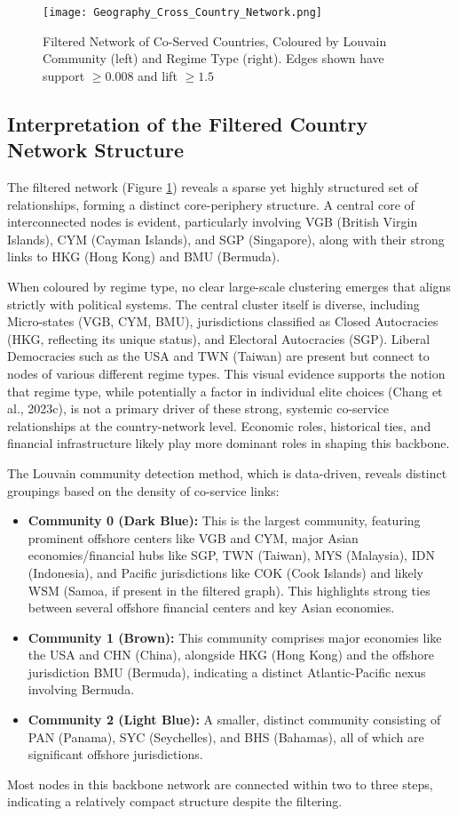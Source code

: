 \begin{figure}[htbp]
    \centering
    \texttt{[image: Geography\_Cross\_Country\_Network.png]}
    \caption{Filtered Network of Co-Served Countries, Coloured by Louvain Community (left) and Regime Type (right). Edges shown have support $\ge 0.008$ and lift $\ge 1.5$}
    \label{fig:geography_cross_country_network}
\end{figure}

\subsection{Interpretation of the Filtered Country Network Structure}
The filtered network (Figure \ref{fig:geography_cross_country_network}) reveals a sparse yet highly structured set of relationships, forming a distinct core-periphery structure. A central core of interconnected nodes is evident, particularly involving VGB (British Virgin Islands), CYM (Cayman Islands), and SGP (Singapore), along with their strong links to HKG (Hong Kong) and BMU (Bermuda).

When coloured by regime type, no clear large-scale clustering emerges that aligns strictly with political systems. The central cluster itself is diverse, including Micro-states (VGB, CYM, BMU), jurisdictions classified as Closed Autocracies (HKG, reflecting its unique status), and Electoral Autocracies (SGP). Liberal Democracies such as the USA and TWN (Taiwan) are present but connect to nodes of various different regime types. This visual evidence supports the notion that regime type, while potentially a factor in individual elite choices (Chang et al., 2023c), is not a primary driver of these strong, systemic co-service relationships at the country-network level. Economic roles, historical ties, and financial infrastructure likely play more dominant roles in shaping this backbone.

The Louvain community detection method, which is data-driven, reveals distinct groupings based on the density of co-service links:
\begin{itemize}
    \item \textbf{Community 0 (Dark Blue):} This is the largest community, featuring prominent offshore centers like VGB and CYM, major Asian economies/financial hubs like SGP, TWN (Taiwan), MYS (Malaysia), IDN (Indonesia), and Pacific jurisdictions like COK (Cook Islands) and likely WSM (Samoa, if present in the filtered graph). This highlights strong ties between several offshore financial centers and key Asian economies.
    \item \textbf{Community 1 (Brown):} This community comprises major economies like the USA and CHN (China), alongside HKG (Hong Kong) and the offshore jurisdiction BMU (Bermuda), indicating a distinct Atlantic-Pacific nexus involving Bermuda.
    \item \textbf{Community 2 (Light Blue):} A smaller, distinct community consisting of PAN (Panama), SYC (Seychelles), and BHS (Bahamas), all of which are significant offshore jurisdictions.
\end{itemize}
Most nodes in this backbone network are connected within two to three steps, indicating a relatively compact structure despite the filtering.

